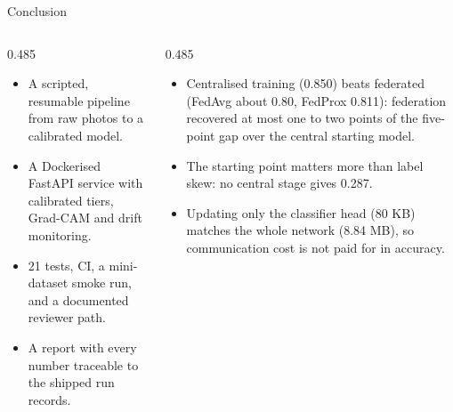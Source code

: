 \documentclass[11pt, aspectratio=169]{beamer}
\begin{document}
\begin{frame}[t]{Conclusion}
  \body
  \begin{columns}[T]
    \begin{column}{0.485\textwidth}
      \par\vspace{0.25em}
      \begin{itemize}\setlength\itemsep{0.25em}
        \item A scripted, resumable pipeline from raw photos to a calibrated model.
        \item A Dockerised FastAPI service with calibrated tiers, Grad-CAM and drift monitoring.
        \item 21 tests, CI, a mini-dataset smoke run, and a documented reviewer path.
        \item A report with every number traceable to the shipped run records.
      \end{itemize}
    \end{column}
    \begin{column}{0.485\textwidth}
      \par\vspace{0.25em}
      \begin{itemize}\setlength\itemsep{0.25em}
        \item Centralised training (0.850) beats federated (FedAvg about 0.80, FedProx 0.811): federation recovered at most one to two points of the five-point gap over the central starting model.
        \item The starting point matters more than label skew: no central stage gives 0.287.
        \item Updating only the classifier head (80 KB) matches the whole network (8.84 MB), so communication cost is not paid for in accuracy.
      \end{itemize}
    \end{column}
  \end{columns}
\end{frame}
\end{document}
